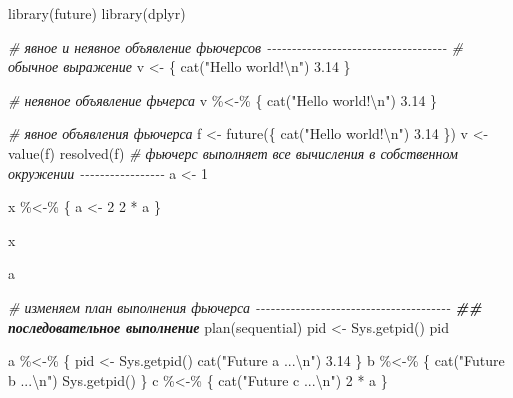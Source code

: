 \documentclass[
]{book}
\newenvironment{Shaded}{\begin{snugshade}}{\end{snugshade}}
\newcommand{\CommentTok}[1]{\textcolor[rgb]{0.56,0.35,0.01}{\textit{#1}}}
\newcommand{\DecValTok}[1]{\textcolor[rgb]{0.00,0.00,0.81}{#1}}
\newcommand{\DocumentationTok}[1]{\textcolor[rgb]{0.56,0.35,0.01}{\textbf{\textit{#1}}}}
\newcommand{\FloatTok}[1]{\textcolor[rgb]{0.00,0.00,0.81}{#1}}
\newcommand{\FunctionTok}[1]{\textcolor[rgb]{0.00,0.00,0.00}{#1}}
\newcommand{\NormalTok}[1]{#1}
\newcommand{\OtherTok}[1]{\textcolor[rgb]{0.56,0.35,0.01}{#1}}
\newcommand{\SpecialCharTok}[1]{\textcolor[rgb]{0.00,0.00,0.00}{#1}}
\newcommand{\StringTok}[1]{\textcolor[rgb]{0.31,0.60,0.02}{#1}}
\begin{document}
\begin{Shaded}
\begin{Highlighting}[]
\FunctionTok{library}\NormalTok{(future)}
\FunctionTok{library}\NormalTok{(dplyr)}

\CommentTok{\# явное и неявное объявление фьючерсов {-}{-}{-}{-}{-}{-}{-}{-}{-}{-}{-}{-}{-}{-}{-}{-}{-}{-}{-}{-}{-}{-}{-}{-}{-}{-}{-}{-}{-}{-}{-}{-}{-}{-}{-}{-}}
\CommentTok{\# обычное выражение}
\NormalTok{v }\OtherTok{\textless{}{-}}\NormalTok{ \{}
  \FunctionTok{cat}\NormalTok{(}\StringTok{"Hello world!}\SpecialCharTok{\textbackslash{}n}\StringTok{"}\NormalTok{)}
  \FloatTok{3.14}
\NormalTok{\}}

\CommentTok{\# неявное объявление фьчерса}
\NormalTok{v }\SpecialCharTok{\%\textless{}{-}\%}\NormalTok{ \{}
  \FunctionTok{cat}\NormalTok{(}\StringTok{"Hello world!}\SpecialCharTok{\textbackslash{}n}\StringTok{"}\NormalTok{)}
  \FloatTok{3.14}
\NormalTok{\}}

\CommentTok{\# явное объявления фьючерса}
\NormalTok{f }\OtherTok{\textless{}{-}} \FunctionTok{future}\NormalTok{(\{}
  \FunctionTok{cat}\NormalTok{(}\StringTok{"Hello world!}\SpecialCharTok{\textbackslash{}n}\StringTok{"}\NormalTok{)}
  \FloatTok{3.14}
\NormalTok{\})}
\NormalTok{v }\OtherTok{\textless{}{-}} \FunctionTok{value}\NormalTok{(f)}
\FunctionTok{resolved}\NormalTok{(f)}
\CommentTok{\# фьючерс выполняет все вычисления в собственном окружении {-}{-}{-}{-}{-}{-}{-}{-}{-}{-}{-}{-}{-}{-}{-}{-}{-}}
\NormalTok{a }\OtherTok{\textless{}{-}} \DecValTok{1}

\NormalTok{x }\SpecialCharTok{\%\textless{}{-}\%}\NormalTok{ \{}
\NormalTok{  a }\OtherTok{\textless{}{-}} \DecValTok{2}
  \DecValTok{2} \SpecialCharTok{*}\NormalTok{ a}
\NormalTok{\}}

\NormalTok{x}

\NormalTok{a}

\CommentTok{\# изменяем план выполнения фьючерса {-}{-}{-}{-}{-}{-}{-}{-}{-}{-}{-}{-}{-}{-}{-}{-}{-}{-}{-}{-}{-}{-}{-}{-}{-}{-}{-}{-}{-}{-}{-}{-}{-}{-}{-}{-}{-}{-}{-}}
\DocumentationTok{\#\# последовательное выполнение}
\FunctionTok{plan}\NormalTok{(sequential)}
\NormalTok{pid }\OtherTok{\textless{}{-}} \FunctionTok{Sys.getpid}\NormalTok{()}
\NormalTok{pid}

\NormalTok{a }\SpecialCharTok{\%\textless{}{-}\%}\NormalTok{ \{}
\NormalTok{  pid }\OtherTok{\textless{}{-}} \FunctionTok{Sys.getpid}\NormalTok{()}
  \FunctionTok{cat}\NormalTok{(}\StringTok{"Future \textquotesingle{}a\textquotesingle{} ...}\SpecialCharTok{\textbackslash{}n}\StringTok{"}\NormalTok{)}
  \FloatTok{3.14}
\NormalTok{  \}}
\NormalTok{b }\SpecialCharTok{\%\textless{}{-}\%}\NormalTok{ \{}
  \FunctionTok{cat}\NormalTok{(}\StringTok{"Future \textquotesingle{}b\textquotesingle{} ...}\SpecialCharTok{\textbackslash{}n}\StringTok{"}\NormalTok{)}
  \FunctionTok{Sys.getpid}\NormalTok{()}
\NormalTok{  \}}
\NormalTok{c }\SpecialCharTok{\%\textless{}{-}\%}\NormalTok{ \{}
  \FunctionTok{cat}\NormalTok{(}\StringTok{"Future \textquotesingle{}c\textquotesingle{} ...}\SpecialCharTok{\textbackslash{}n}\StringTok{"}\NormalTok{)}
  \DecValTok{2} \SpecialCharTok{*}\NormalTok{ a}
\NormalTok{  \}}


\end{Highlighting}
\end{Shaded}
\end{document}
